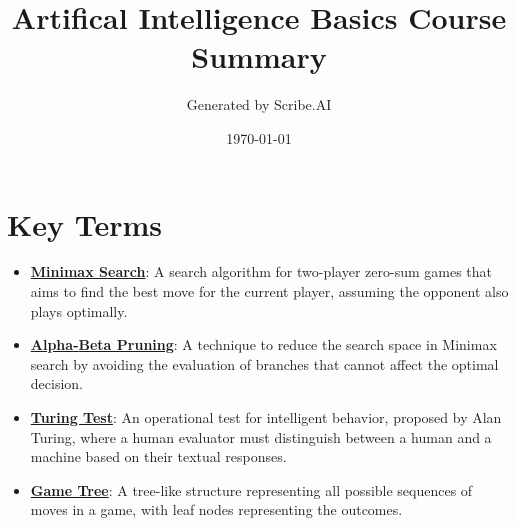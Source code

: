 \documentclass{article}%
\title{Artifical Intelligence Basics Course Summary}%
\author{Generated by Scribe.AI}%
\date{\today}%
\begin{document}
%
\normalsize%
\maketitle%
\section{Key Terms}%
\label{sec:KeyTerms}%
\begin{itemize}[leftmargin=*]%
\item \href{https://purdue.brightspace.com/d2l/common/assets/pdfjs-d2l-dist/1.0.14-legacy/web/viewer.html?file=\%2Fcontent\%2Fenforced\%2F1095467-wl.202510.CS.24300.001\%2F02L2-Intro.pdf\%3Fou\%3D1095467\&lang=en-us\&container=d2l-fileviewer-rendered-pdf\&fullscreen=d2l-fileviewer-rendered-pdf-dialog\&height=667#page=22}{\textbf{Minimax Search}}: A search algorithm for two-player zero-sum games that aims to find the best move for the current player, assuming the opponent also plays optimally.%
\item \href{https://purdue.brightspace.com/d2l/common/assets/pdfjs-d2l-dist/1.0.14-legacy/web/viewer.html?file=\%2Fcontent\%2Fenforced\%2F1095467-wl.202510.CS.24300.001\%2F02L2-Intro.pdf\%3Fou\%3D1095467\&lang=en-us\&container=d2l-fileviewer-rendered-pdf\&fullscreen=d2l-fileviewer-rendered-pdf-dialog\&height=667#page=23}{\textbf{Alpha{-}Beta Pruning}}: A technique to reduce the search space in Minimax search by avoiding the evaluation of branches that cannot affect the optimal decision.%
\item \href{https://purdue.brightspace.com/d2l/common/assets/pdfjs-d2l-dist/1.0.14-legacy/web/viewer.html?file=\%2Fcontent\%2Fenforced\%2F1095467-wl.202510.CS.24300.001\%2F02L2-Intro.pdf\%3Fou\%3D1095467\&lang=en-us\&container=d2l-fileviewer-rendered-pdf\&fullscreen=d2l-fileviewer-rendered-pdf-dialog\&height=667#page=6}{\textbf{Turing Test}}: An operational test for intelligent behavior, proposed by Alan Turing, where a human evaluator must distinguish between a human and a machine based on their textual responses.%
\item \href{https://purdue.brightspace.com/d2l/common/assets/pdfjs-d2l-dist/1.0.14-legacy/web/viewer.html?file=\%2Fcontent\%2Fenforced\%2F1095467-wl.202510.CS.24300.001\%2F02L2-Intro.pdf\%3Fou\%3D1095467\&lang=en-us\&container=d2l-fileviewer-rendered-pdf\&fullscreen=d2l-fileviewer-rendered-pdf-dialog\&height=667#page=11}{\textbf{Game Tree}}: A tree-like structure representing all possible sequences of moves in a game, with leaf nodes representing the outcomes.%

\end{itemize}
\end{document}
